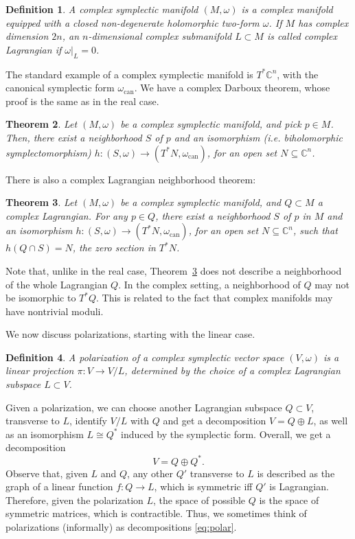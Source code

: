 \documentclass [11pt]{amsart}
\newtheorem {theorem}{Theorem}[section]
\newtheorem {definition}[theorem]{Definition}
\theoremstyle{remark}
\def\cc {{\mathbb{C}}}
\def\C{\cc}
\def\can{\operatorname{can}}
\begin{document}
\begin{definition}
A {\em complex symplectic manifold} $(M, \omega)$ is a complex manifold equipped with a closed non-degenerate holomorphic two-form $\omega$. If $M$ has complex dimension $2n$, an $n$-dimensional complex submanifold $L \subset M$ is called {\em complex Lagrangian} if $\omega|_L=0$.
\end{definition}

The standard example of a complex symplectic manifold is $T^*\C^n$, with the canonical symplectic form $\omega_{\can}$. We have a complex Darboux theorem, whose proof is the same as in the real case.
\begin{theorem}
\label{thm:Darboux}
Let $(M, \omega)$ be a complex symplectic manifold, and pick $p \in M$. Then, there exist a neighborhood $S$ of $p$ and an isomorphism (i.e. biholomorphic symplectomorphism) $h: (S, \omega) \to (T^*N, \omega_{\can})$, for an open set $N \subseteq \C^n$.
\end{theorem}

There is also a complex Lagrangian neighborhood theorem:
\begin{theorem}
\label{thm:CxLagNbhd}
Let $(M, \omega)$ be a complex symplectic manifold, and $Q \subset M$ a complex Lagrangian. For any $p \in Q$, there exist a neighborhood $S$ of $p$ in $M$ and an isomorphism $h: (S, \omega) \to (T^*N, \omega_{\can})$, for an open set $N \subseteq \C^n$, such that $h(Q \cap S) = N$, the zero section in $T^*N$.
\end{theorem}

Note that, unlike in the real case, Theorem~\ref{thm:CxLagNbhd} does not describe a neighborhood of the whole Lagrangian $Q$. In the complex setting, a neighborhood of $Q$ may not be isomorphic to $T^*Q$. This is related to the fact that complex manifolds may have nontrivial moduli.

We now discuss polarizations, starting with the linear case.
\begin{definition}
A {\em polarization} of a complex symplectic vector space $(V, \omega)$ is a linear projection $\pi: V \to V/L$, determined by the choice of a complex Lagrangian subspace $L \subset V$. 
\end{definition}

Given a polarization, we can choose another Lagrangian subspace $Q \subset V$, transverse to $L$, identify $V/L$ with $Q$ and get a decomposition $V=Q \oplus L$, as well as an isomorphism $L \cong Q^*$ induced by the symplectic form. Overall, we get a decomposition 
\begin{equation}
\label{eq:polar}
V = Q \oplus Q^*.
\end{equation}  Observe that, given $L$ and $Q$, any other $Q'$  transverse to $L$ is described as the graph of a linear function $f: Q \to L$, which is symmetric iff $Q'$ is Lagrangian. Therefore, given the polarization $L$, the space of possible $Q$ is the space of symmetric matrices, which is  contractible. Thus, we sometimes think of polarizations (informally) as decompositions \eqref{eq:polar}.
\end{document}
